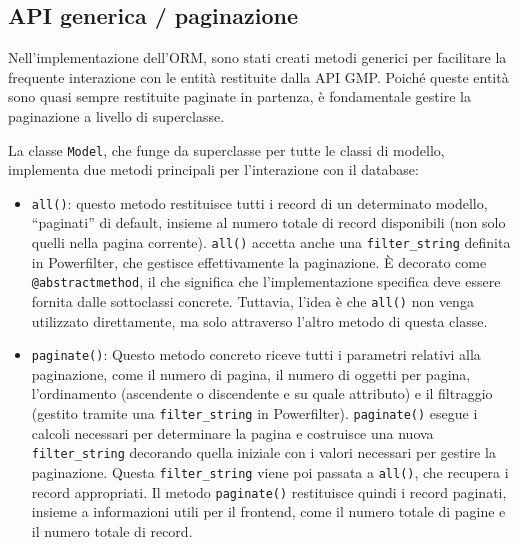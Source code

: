 \subsection{API generica / paginazione}
Nell'implementazione dell'ORM, sono stati creati metodi generici per facilitare la frequente interazione con le entità restituite dalla API GMP. Poiché queste entità sono quasi sempre restituite paginate in partenza, è fondamentale gestire la paginazione a livello di superclasse.

La classe \texttt{Model}, che funge da superclasse per tutte le classi di modello, implementa due metodi principali per l'interazione con il database:
\begin{itemize}
    \item \texttt{all()}: questo metodo restituisce tutti i record di un determinato modello, ``paginati'' di default, insieme al numero totale di record disponibili (non solo quelli nella pagina corrente). \texttt{all()} accetta anche una \texttt{filter\_string} definita in Powerfilter, che gestisce effettivamente la paginazione. È decorato come \texttt{@abstractmethod}, il che significa che l'implementazione specifica deve essere fornita dalle sottoclassi concrete. Tuttavia, l'idea è che \texttt{all()} non venga utilizzato direttamente, ma solo attraverso l'altro metodo di questa classe.
    \item \texttt{paginate()}: Questo metodo concreto riceve tutti i parametri relativi alla paginazione, come il numero di pagina, il numero di oggetti per pagina, l'ordinamento (ascendente o discendente e su quale attributo) e il filtraggio (gestito tramite una \texttt{filter\_string} in Powerfilter). \texttt{paginate()} esegue i calcoli necessari per determinare la pagina e costruisce una nuova \texttt{filter\_string} decorando quella iniziale con i valori necessari per gestire la paginazione. Questa \texttt{filter\_string} viene poi passata a \texttt{all()}, che recupera i record appropriati. Il metodo \texttt{paginate()} restituisce quindi i record paginati, insieme a informazioni utili per il frontend, come il numero totale di pagine e il numero totale di record.
\end{itemize}

